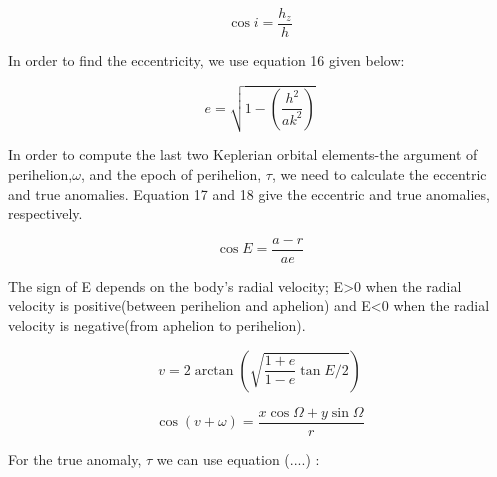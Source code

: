 \documentclass[letterpaper,12pt]{article}
\begin{document}
\begin{equation}
\cos i = \frac{h_{z}}{h}
\end{equation}

In order to find the eccentricity, we use equation 16 given below:

\begin{equation}
e=\sqrt{1-(\frac{h^2}{ak^2})}
\end{equation}

In order to compute the last two Keplerian orbital elements-the argument of perihelion,\begin{math} \omega \end{math}, and the epoch of perihelion, \begin{math} \tau \end{math}, we need to calculate the eccentric and true anomalies. Equation 17 and 18 give the eccentric and true anomalies, respectively.

\begin{equation}
\cos E = \frac{a-r}{ae}
\end{equation}

The sign of E depends on the body's radial velocity; E>0 when the radial velocity is positive(between perihelion and aphelion) and E<0 when the radial velocity is negative(from aphelion to perihelion).

\begin{equation}
v = 2\arctan(\sqrt{\frac{1+e}{1-e}\tan E/2})
\end{equation}

\begin{equation}
\cos (v+\omega) = \frac{x \cos \Omega + y \sin \Omega}{r} 
\end{equation}


For the true anomaly, \begin{math} \tau \end{math} we can use equation (....) :
\end{document}
